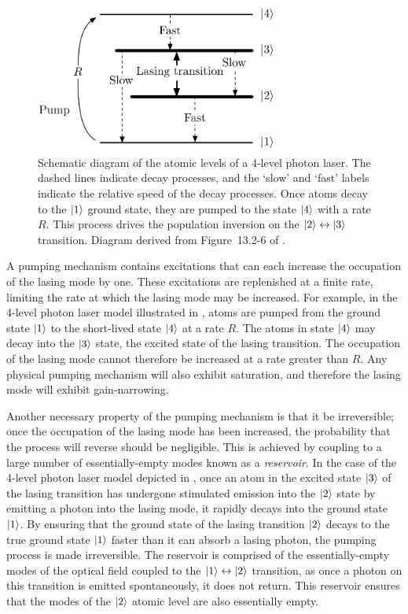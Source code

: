 \begin{figure}
    \centering
    \includegraphics[width=8cm]{4LevelOpticalLaserModel}
    \caption{
        \label{Introduction:4LevelOpticalLaserModel}
        Schematic diagram of the atomic levels of a 4-level photon laser.  The dashed lines indicate decay processes, and the `slow' and `fast' labels indicate the relative speed of the decay processes.  Once atoms decay to the ${\left|1\right>}$ ground state, they are pumped to the state ${\left|4\right>}$ with a rate $R$.  This process drives the population inversion on the ${\left|2\right>} \leftrightarrow{\ensuremath{\left|3\right>}}$ transition.  Diagram derived from Figure~13.2-6 of \citet{SalehTeich}.
    }
\end{figure}

A pumping mechanism contains excitations that can each increase the occupation of the lasing mode by one.  These excitations are replenished at a finite rate, limiting the rate at which the lasing mode may be increased.  For example, in the 4-level photon laser model illustrated in , atoms are pumped from the ground state ${\left|1\right>}$ to the short-lived state ${\left|4\right>}$ at a rate $R$.  The atoms in state ${\left|4\right>}$ may decay into the ${\left|3\right>}$ state, the excited state of the lasing transition.  The occupation of the lasing mode cannot therefore be increased at a rate greater than $R$.  Any physical pumping mechanism will also exhibit saturation, and therefore the lasing mode will exhibit gain-narrowing.

Another necessary property of the pumping mechanism is that it be irreversible; once the occupation of the lasing mode has been increased, the probability that the process will reverse should be negligible.  This is achieved by coupling to a large number of essentially-empty modes known as a \emph{reservoir}.  In the case of the 4-level photon laser model depicted in , once an atom in the excited state ${\left|3\right>}$ of the lasing transition has undergone stimulated emission into the ${\left|2\right>}$ state by emitting a photon into the lasing mode, it rapidly decays into the ground state ${\left|1\right>}$.  By ensuring that the ground state of the lasing transition ${\left|2\right>}$ decays to the true ground state ${\left|1\right>}$ faster than it can absorb a lasing photon, the pumping process is made irreversible.  The reservoir is comprised of the essentially-empty modes of the optical field coupled to the ${\left|1\right>} \leftrightarrow {\ensuremath{\left|2\right>}}$ transition, as once a photon on this transition is emitted spontaneously, it does not return.  This reservoir ensures that the modes of the ${\left|2\right>}$ atomic level are also essentially empty.


